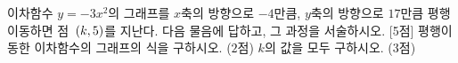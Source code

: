이차함수 $y=-3x^2$의 그래프를 $x$축의 방향으로 $-4$만큼, $y$축의 방향으로 $17$만큼 평행이동하면 점~$(k{,}\mkern3mu 5)$를 지난다. 다음 물음에 답하고, 그 과정을 서술하시오. \mbox{[5점]}
 평행이동한 이차함수의 그래프의 식을 구하시오. ($2$점)
 $k$의 값을 모두 구하시오. ($3$점)
